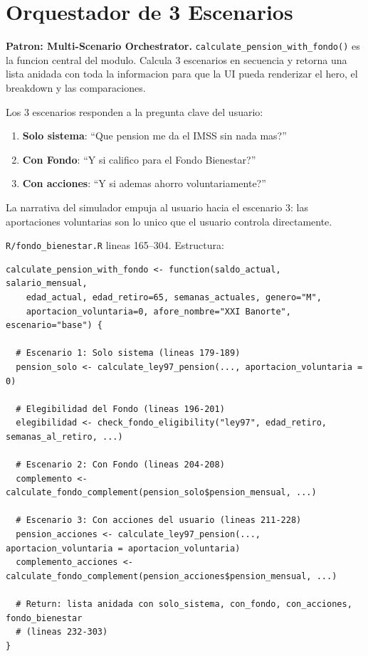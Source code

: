 \documentclass[11pt, letterpaper, twoside]{report}
\begin{document}
\section{Orquestador de 3 Escenarios}
\label{sec:orquestador}

\begin{patronbox}
\textbf{Patron: Multi-Scenario Orchestrator.}
\texttt{calculate\_pension\_with\_fondo()} es la funcion central del modulo. Calcula
3 escenarios en secuencia y retorna una lista anidada con toda la informacion
para que la UI pueda renderizar el hero, el breakdown y las comparaciones.
\end{patronbox}

\begin{intuicionbox}
Los 3 escenarios responden a la pregunta clave del usuario:
\begin{enumerate}[nosep]
\item \textbf{Solo sistema}: ``Que pension me da el IMSS sin nada mas?''
\item \textbf{Con Fondo}: ``Y si califico para el Fondo Bienestar?''
\item \textbf{Con acciones}: ``Y si ademas ahorro voluntariamente?''
\end{enumerate}
La narrativa del simulador empuja al usuario hacia el escenario 3: las aportaciones
voluntarias son lo unico que el usuario controla directamente.
\end{intuicionbox}

\begin{codigobox}
\texttt{R/fondo\_bienestar.R} lineas 165--304. Estructura:
\begin{lstlisting}[caption={Orquestador de 3 escenarios}]
calculate_pension_with_fondo <- function(saldo_actual, salario_mensual,
    edad_actual, edad_retiro=65, semanas_actuales, genero="M",
    aportacion_voluntaria=0, afore_nombre="XXI Banorte", escenario="base") {

  # Escenario 1: Solo sistema (lineas 179-189)
  pension_solo <- calculate_ley97_pension(..., aportacion_voluntaria = 0)

  # Elegibilidad del Fondo (lineas 196-201)
  elegibilidad <- check_fondo_eligibility("ley97", edad_retiro, semanas_al_retiro, ...)

  # Escenario 2: Con Fondo (lineas 204-208)
  complemento <- calculate_fondo_complement(pension_solo$pension_mensual, ...)

  # Escenario 3: Con acciones del usuario (lineas 211-228)
  pension_acciones <- calculate_ley97_pension(..., aportacion_voluntaria = aportacion_voluntaria)
  complemento_acciones <- calculate_fondo_complement(pension_acciones$pension_mensual, ...)

  # Return: lista anidada con solo_sistema, con_fondo, con_acciones, fondo_bienestar
  # (lineas 232-303)
}
\end{lstlisting}
\end{codigobox}
\end{document}

